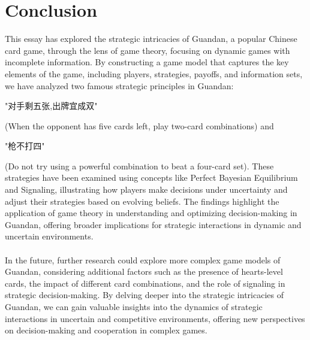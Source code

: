 \documentclass{article}
\begin{document}
\section{Conclusion}
This essay has explored the strategic intricacies of Guandan, a popular Chinese card game, through the lens of game theory, focusing on dynamic games with incomplete information. By constructing a game model that captures the key elements of the game, including players, strategies, payoffs, and information sets, we have analyzed two famous strategic principles in Guandan:
\begin{CJK*}{UTF8}{gbsn}"对手剩五张,出牌宜成双" \end{CJK*}
(When the opponent has five cards left, play two-card combinations) and
\begin{CJK*}{UTF8}{gbsn}"枪不打四"  \end{CJK*}
(Do not try using a powerful combination to beat a four-card set). These strategies have been examined using concepts like Perfect Bayesian Equilibrium and Signaling, illustrating how players make decisions under uncertainty and adjust their strategies based on evolving beliefs. The findings highlight the application of game theory in understanding and optimizing decision-making in Guandan, offering broader implications for strategic interactions in dynamic and uncertain environments.
\\ \hspace*{\fill} \\
In the future, further research could explore more complex game models of Guandan, considering additional factors such as the presence of hearts-level cards, the impact of different card combinations, and the role of signaling in strategic decision-making. By delving deeper into the strategic intricacies of Guandan, we can gain valuable insights into the dynamics of strategic interactions in uncertain and competitive environments, offering new perspectives on decision-making and cooperation in complex games.
\end{document}
